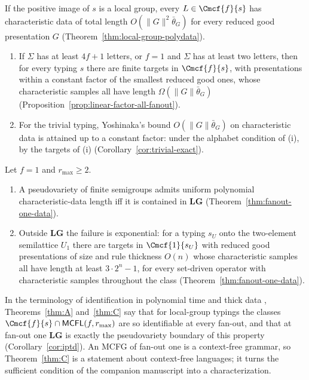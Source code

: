 \begin{mainthm}
\label{thm:A}
If the positive image of $s$ is a local group, every $L\in\Cmcf{f}{s}$ has
characteristic data of total length $O(\|G\|^2\bar\theta_G)$ for every reduced
good presentation $G$ \textup(Theorem~\ref{thm:local-group-polydata}\textup).
\end{mainthm}

\begin{mainthm}
\label{thm:B}
\begin{enumerate}[label=\textup{(\roman*)},leftmargin=*]
\item If $\Sigma$ has at least $4f+1$ letters, or $f=1$ and $\Sigma$ has at least
two letters, then for every typing $s$ there are finite targets in
$\Cmcf{f}{s}$, with presentations within a constant factor of the smallest
reduced good ones, whose characteristic samples all have length
$\Omega(\|G\|\bar\theta_G)$
\textup(Proposition~\ref{prop:linear-factor-all-fanout}\textup).
\item For the trivial typing, Yoshinaka's bound $O(\|G\|\bar\theta_G)$ on characteristic
data \cite{Yoshinaka2011} is attained up to a constant factor: under the alphabet
condition of \textup{(i)}, by the targets of \textup{(i)}
\textup(Corollary~\ref{cor:trivial-exact}\textup).
\end{enumerate}
\end{mainthm}

\begin{mainthm}
\label{thm:C}
Let $f=1$ and $r_{\max}\ge2$.
\begin{enumerate}[label=\textup{(\roman*)},leftmargin=*]
\item A pseudovariety of finite semigroups admits uniform polynomial
characteristic-data length iff it is contained in $\mathbf{LG}$
\textup(Theorem~\ref{thm:fanout-one-data}\textup).
\item Outside $\mathbf{LG}$ the failure is exponential: for a typing $s_U$ onto
the two-element semilattice $U_1$ there are targets in $\Cmcf{1}{s_U}$ with
reduced good presentations of size and rule thickness $O(n)$ whose
characteristic samples all have length at least $3\cdot2^n-1$, for every
set-driven operator with characteristic samples throughout the class
\textup(Theorem~\ref{thm:fanout-one-data}\textup).
\end{enumerate}
\end{mainthm}

In the terminology of identification in polynomial time and thick data
\cite{Yoshinaka2008,EyraudHeinzYoshinaka2016}, Theorems~\ref{thm:A}
and~\ref{thm:C} say that for local-group typings the classes
$\Cmcf{f}{s}\cap\mathsf{MCFL}(f,r_{\max})$ are so identifiable at every fan-out,
and that at fan-out one $\mathbf{LG}$ is exactly the pseudovariety boundary of
this property (Corollary~\ref{cor:iptd}).  An MCFG of
fan-out one is a context-free grammar, so Theorem~\ref{thm:C} is a statement
about context-free languages; it turns the sufficient condition of the
companion manuscript \cite{kuriyamaCFG} into a characterization.

